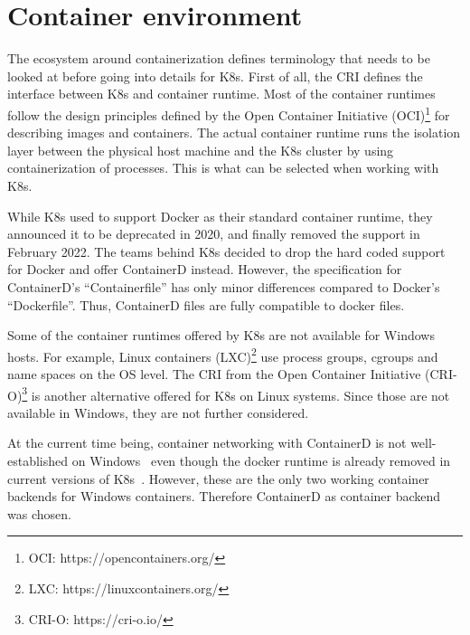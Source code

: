 \section{Container environment}
The ecosystem around containerization defines terminology that needs to be looked at before going into details for \ac{K8s}. First of all, the \acf{CRI} defines the interface between \ac{K8s} and container runtime. Most of the container runtimes follow the design principles defined by the Open Container Initiative (OCI)\footnote{OCI: https://opencontainers.org/} for describing images and containers. The actual container runtime runs the isolation layer between the physical host machine and the \ac{K8s} cluster by using containerization of processes. This is what can be selected when working with \ac{K8s}.

While \ac{K8s} used to support Docker as their standard container runtime, they announced it to be deprecated in 2020, and finally removed the support in February 2022\cite{Kubernetes.2020, Kubernetes.2022}. The teams behind \ac{K8s} decided to drop the hard coded support for Docker and offer ContainerD instead.
However, the specification for ContainerD's \enquote{Containerfile} has only minor differences compared to Docker's \enquote{Dockerfile}. Thus, ContainerD files are fully compatible to docker files.

Some of the container runtimes offered by \ac{K8s} are not available for \ac{Windows} hosts. For example, Linux containers (LXC)\footnote{LXC: https://linuxcontainers.org/} use process groups, \acp{cgroup} and name spaces on the \ac{OS} level.
The \ac{CRI} from the Open Container Initiative (CRI-O)\footnote{CRI-O: https://cri-o.io/} is another alternative offered for \ac{K8s} on Linux systems. Since those are not available in \ac{Windows}, they are not further considered.

At the current time being, container networking with ContainerD is not well-established on \ac{Windows}~\cite{GitHub.20230202,GitHub.20230202b,Github.2022_258,GitHub.20230202c} even though the docker runtime is already removed in current versions of \ac{K8s}~\cite{Kubernetes.2020}. However, these are the only two working container backends for \ac{Windows} containers. Therefore ContainerD as container backend was chosen.

